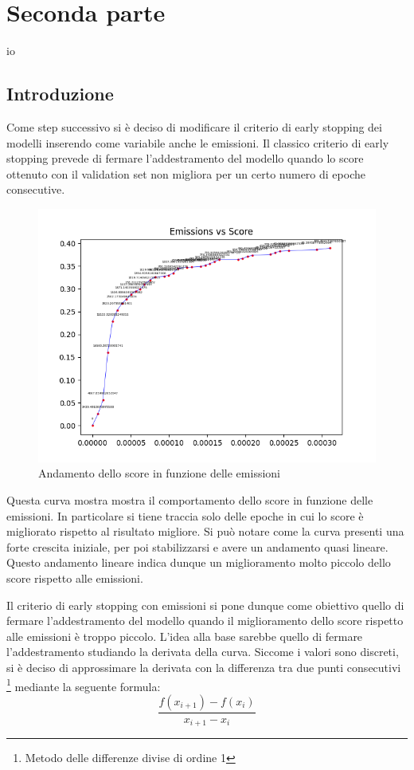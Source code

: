 \section{Seconda parte}io\subsection{Introduzione}
Come step successivo si è deciso di modificare il criterio di early stopping dei modelli inserendo come variabile anche le emissioni.
Il classico criterio di early stopping prevede di fermare l'addestramento del modello quando lo score ottenuto con il validation set non migliora per un certo numero di epoche consecutive.


\begin{figure}[H]
    \centering
     \includegraphics[width=\textwidth]{images/curve_emissions_score.png}
    \caption{Andamento dello score in funzione delle emissioni}
\end{figure}

\noindent Questa curva mostra mostra il comportamento dello score in funzione delle emissioni. In particolare si tiene traccia solo delle epoche in cui lo score è migliorato rispetto al risultato migliore.
Si può notare come la curva presenti una forte crescita iniziale, per poi stabilizzarsi e avere un andamento quasi lineare.
Questo andamento lineare indica dunque un miglioramento molto piccolo dello score rispetto alle emissioni.

\noindent Il criterio di early stopping con emissioni si pone dunque come obiettivo quello di fermare l'addestramento del modello quando il miglioramento dello score rispetto alle emissioni è troppo piccolo.
L'idea alla base sarebbe quello di fermare l'addestramento studiando la derivata della curva. Siccome i valori sono discreti, si è deciso di approssimare la derivata con la differenza tra due punti consecutivi \footnote{Metodo delle differenze divise di ordine 1}{} mediante la seguente formula:
\begin{equation}
    \frac{f(x_{i+1}) - f(x_i)}{x_{i+1} - x_i}
\end{equation}

